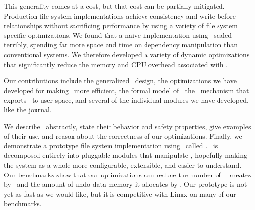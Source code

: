 \begin{comment}
The \Kudos\ storage system implementation is decomposed entirely into
 pluggable \modules\ that manipulate \patches, hopefully making the system
 as a whole more configurable, extensible, and easier to understand.
%
Any storage system \module\ can generate \patches; other modules can examine
 them and modify them when required.
%
\Patch\ dependencies are obeyed by all other storage system layers, allowing
 them to be passed through layers such as loopback block devices.
%
As a result, the loosely-coupled \modules\ that implement a file system
 can cooperate to enforce strong and often complex consistency guarantees,
 even though each \module\ only does a small part of the work.
\end{comment}


This generality comes at a cost, but that cost can be partially mitigated.
%
Production file system implementations achieve consistency and write before
 relationships without sacrificing performance by using a variety of file
 system specific optimizations.
%
We found that a naive implementation using \patches\ scaled terribly,
 spending far more space and time on dependency manipulation than
 conventional systems.
%
We therefore developed a variety of dynamic optimizations that
 significantly reduce the memory and CPU overhead associated with \patches.


Our contributions include the generalized \patch\ design, the
 optimizations we have developed for making \patches\ more efficient,
 the formal model of \patches, the \patchgroup\ mechanism that exports
 \patches\ to user space, and several of the individual modules we
 have developed, like the journal.


We describe \patches\ abstractly, state their behavior and safety
 properties, give examples of their use, and reason about the
 correctness of our optimizations.
%
Finally, we demonstrate a prototype file system implementation using
 \patches\ called \Kudos.
%
\Kudos\ is decomposed entirely into pluggable modules that manipulate
 \patches, hopefully making the system as a whole more configurable,
 extensible, and easier to understand.
%
Our benchmarks show that our optimizations can reduce the number of
 \patches\ \Kudos\ creates by \patchoptcount\ and the amount of undo data
 memory it allocates by \patchoptundo.
%
Our prototype is not yet as fast as we would like, but it is competitive
 with Linux on many of our benchmarks.
